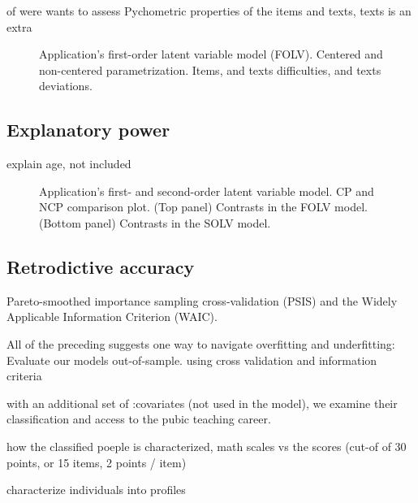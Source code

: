 of were wants to assess  Pychometric properties of the items and texts, texts is an extra
%
\begin{figure}[H]
	\centering
	\begin{subfigure}
		\texttt{[image: FOLV\_recovery\_items]}
	\end{subfigure}
	\begin{subfigure}
		\texttt{[image: FOLV\_recovery\_texts]}
	\end{subfigure}
	\caption[Application's first-order latent variable model (FOLV). Centered and non-centered parametrization. Items, and texts difficulties, and texts deviations.]%
	{Application's first-order latent variable model (FOLV). Centered and non-centered parametrization. Items, and texts difficulties, and texts deviations.}
	\label{fig:FOLV_CE.NC_recovery}
\end{figure}



\subsection{Explanatory power} \label{sect:explanation}

explain age, not included
%
\begin{figure}[H]
	\centering
	\begin{subfigure}
		\texttt{[image: FOLV\_recovery\_contrast]}
	\end{subfigure}
	\begin{subfigure}
		\texttt{[image: SOLV\_recovery\_contrast]}
	\end{subfigure}
%
	\caption[Application's first- and second-order latent variable model. CP and NCP comparison plot.]%
	{Application's first- and second-order latent variable model. CP and NCP comparison plot. (Top panel) Contrasts in the FOLV model. (Bottom panel) Contrasts in the SOLV model. }
	\label{fig:contrast_both}
\end{figure}


\subsection{Retrodictive accuracy}

Pareto-smoothed importance sampling cross-validation (PSIS) and the  Widely Applicable Information Criterion (WAIC).

All of the preceding suggests one way to navigate overfitting and underfitting: Evaluate our models out-of-sample. using cross validation and information criteria


with an additional set of :covariates (not used in the model), we examine their classification and access to the pubic teaching career. 

how the classified poeple is characterized, math scales vs the scores (cut-of of 30 points, or 15 items, 2 points / item)

characterize individuals into profiles 




